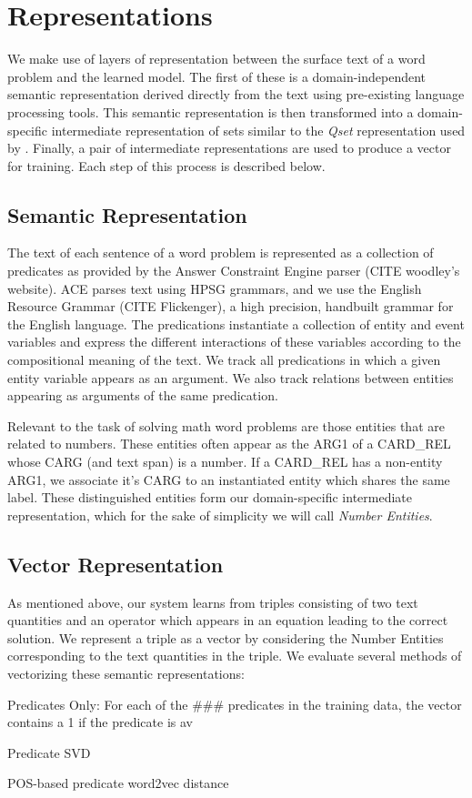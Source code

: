 \section{Representations}
We make use of layers of representation between the surface text of a word problem and the learned model. 
The first of these is a domain-independent semantic representation derived directly from the text using pre-existing language processing tools.
This semantic representation is then transformed into a domain-specific intermediate representation of sets similar to the {\it Qset} representation used by \cite{konked2015}. 
Finally, a pair of intermediate representations are used to produce a vector for training. 
Each step of this process is described below.

\subsection{Semantic Representation}
\label{semantics}
The text of each sentence of a word problem is represented as a collection of predicates as provided by the Answer Constraint Engine parser (CITE woodley's website).
ACE parses text using HPSG grammars, and we use the English Resource Grammar (CITE Flickenger), a high precision, handbuilt grammar for the English language. 
The predications instantiate a collection of entity and event variables and express the different interactions of these variables according to the compositional meaning of the text. 
We track all predications in which a given entity variable appears as an argument.
We also track relations between entities appearing as arguments of the same predication.

Relevant to the task of solving math word problems are those entities that are related to numbers.
These entities often appear as the ARG1 of a CARD_REL whose CARG (and text span) is a number. 
If a CARD_REL has a non-entity ARG1, we associate it's CARG to an instantiated entity which shares the same label. 
These distinguished entities form our domain-specific intermediate representation, which for the sake of simplicity we will call {\it Number Entities}.

\subsection{Vector Representation}
\label{vectors}
As mentioned above, our system learns from triples consisting of two text quantities and an operator which appears in an equation leading to the correct solution. 
We represent a triple as a vector by considering the Number Entities corresponding to the text quantities in the triple. 
We evaluate several methods of vectorizing these semantic representations:
\begin{compactenum}
\item Predicates Only: For each of the ### predicates in the training data, the vector contains a 1 if the predicate is av
\item Predicate SVD
\item POS-based predicate word2vec distance
\end{compactenum}


